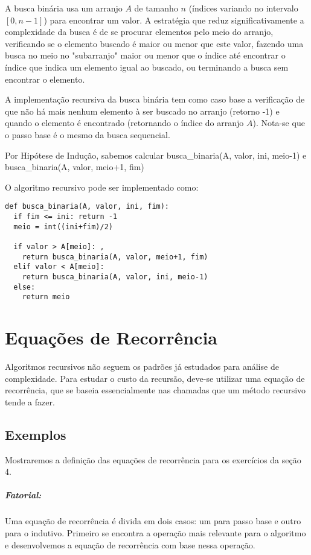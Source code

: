 \documentclass[a4paper, twocolumn]{article}
\theoremstyle{definition}
\begin{document}
A busca binária usa um arranjo $A$ de tamanho $n$ (índices variando no intervalo $[0,n-1]$) para encontrar um valor. A estratégia que reduz significativamente a complexidade da busca é de se procurar elementos pelo meio do arranjo, verificando se o elemento buscado é maior ou menor que este valor, fazendo uma busca no meio no "subarranjo" maior ou menor que o índice até encontrar o índice que indica um elemento igual ao buscado, ou terminando a busca sem encontrar o elemento.

A implementação recursiva da busca binária tem como caso base a verificação de que não há mais nenhum elemento à ser buscado no arranjo (retorno -1) e quando o elemento é encontrado (retornando o índice do arranjo $A$). Nota-se que o passo base é o mesmo da busca sequencial.

Por Hipótese de Indução, sabemos calcular busca\_binaria(A, valor, ini, meio-1) e busca\_binaria(A, valor, meio+1, fim)

O algoritmo recursivo pode ser implementado como:

\begin{lstlisting}[label=busca_binaria_rec,caption= Busca binária recursiva]
def busca_binaria(A, valor, ini, fim):
  if fim <= ini: return -1
  meio = int((ini+fim)/2)
  
  if valor > A[meio]: ,
    return busca_binaria(A, valor, meio+1, fim)
  elif valor < A[meio]: 
    return busca_binaria(A, valor, ini, meio-1)
  else: 
    return meio	
\end{lstlisting}

\section{Equações de Recorrência}
Algoritmos recursivos não seguem os padrões já estudados para análise de complexidade. Para estudar o custo da recursão, deve-se utilizar uma equação de recorrência, que se baseia essencialmente nas chamadas que um método recursivo tende a fazer.

\subsection{Exemplos}
Mostraremos a definição das equações de recorrência para os exercícios da seção 4.

\subparagraph{Fatorial:}
Uma equação de recorrência é divida em dois casos: um para passo base e outro para o indutivo. Primeiro se encontra a operação mais relevante para o algoritmo e desenvolvemos a equação de recorrência com base nessa operação. 
\end{document}
